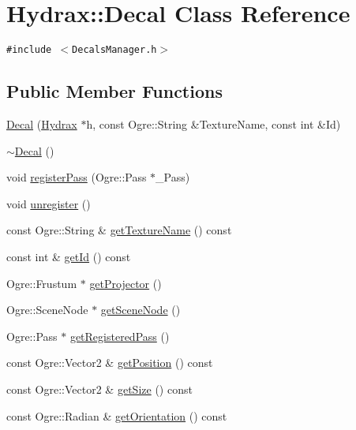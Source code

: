 \hypertarget{class_hydrax_1_1_decal}{
\section{Hydrax::Decal Class Reference}
\label{class_hydrax_1_1_decal}
}
{\tt \#include $<$DecalsManager.h$>$}

\subsection*{Public Member Functions}
\begin{CompactItemize}
\item 
\hyperlink{class_hydrax_1_1_decal_85bc65b9ca9265d69693da7a90d3382e}{Decal} (\hyperlink{class_hydrax_1_1_hydrax}{Hydrax} $\ast$h, const Ogre::String \&TextureName, const int \&Id)
\item 
\hyperlink{class_hydrax_1_1_decal_aad4588738304d06a93271d28f2afcdc}{$\sim$Decal} ()
\item 
void \hyperlink{class_hydrax_1_1_decal_8c81f3988be73eac2c1c03f947c74ed9}{registerPass} (Ogre::Pass $\ast$\_\-Pass)
\item 
void \hyperlink{class_hydrax_1_1_decal_a517fc153970df9ccabffda04b27892c}{unregister} ()
\item 
const Ogre::String \& \hyperlink{class_hydrax_1_1_decal_c7645e2aca71f621bace32fd8749db84}{getTextureName} () const 
\item 
const int \& \hyperlink{class_hydrax_1_1_decal_616f8a17b1e140b68bc4fda390c4bbf6}{getId} () const 
\item 
Ogre::Frustum $\ast$ \hyperlink{class_hydrax_1_1_decal_f10c4fe7b59a31e9dea6d44a94b39322}{getProjector} ()
\item 
Ogre::SceneNode $\ast$ \hyperlink{class_hydrax_1_1_decal_c2570f0d1977b11ccb5746a3518210c2}{getSceneNode} ()
\item 
Ogre::Pass $\ast$ \hyperlink{class_hydrax_1_1_decal_436d4064d3f5e2b84fbc006db82da935}{getRegisteredPass} ()
\item 
const Ogre::Vector2 \& \hyperlink{class_hydrax_1_1_decal_56457d138e4d109486eb83194ce05507}{getPosition} () const 
\item 
const Ogre::Vector2 \& \hyperlink{class_hydrax_1_1_decal_2d4f5cfd15c4450a87063e50e178f4ff}{getSize} () const 
\item 
const Ogre::Radian \& \hyperlink{class_hydrax_1_1_decal_81f991775c4fb8d026d7c8d4b2f0ef7d}{getOrientation} () const 
\item 

\end{CompactItemize}
